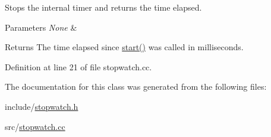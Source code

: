 Stops the internal timer and returns the time elapsed. 


\begin{DoxyParams}{Parameters}
{\em None} & \\
\hline
\end{DoxyParams}
\begin{DoxyReturn}{Returns}
The time elapsed since \mbox{\hyperlink{classStopwatch_aff8757dda8e913cc671eb3baeb662109}{start()}} was called in milliseconds. 
\end{DoxyReturn}


Definition at line 21 of file stopwatch.\+cc.



The documentation for this class was generated from the following files\+:\begin{DoxyCompactItemize}
\item 
include/\mbox{\hyperlink{stopwatch_8h}{stopwatch.\+h}}\item 
src/\mbox{\hyperlink{stopwatch_8cc}{stopwatch.\+cc}}\end{DoxyCompactItemize}
